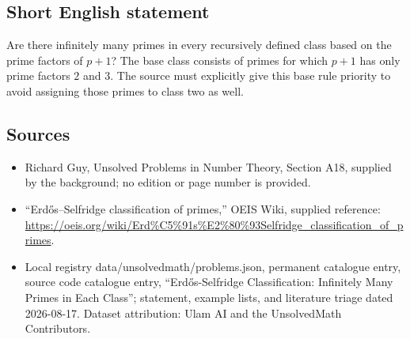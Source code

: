 \documentclass[11pt]{article}
\begin{document}
\subsection{Short English statement}
Are there infinitely many primes in every recursively defined class based on the prime factors of $p+1$? The base class consists of primes for which $p+1$ has only prime factors $2$ and $3$. The source must explicitly give this base rule priority to avoid assigning those primes to class two as well.
\subsection{Sources}
\begin{itemize}
\item Richard Guy, Unsolved Problems in Number Theory, Section A18, supplied by the background; no edition or page number is provided.
\item ``Erd\H{o}s--Selfridge classification of primes,'' OEIS Wiki, supplied reference: \url{https://oeis.org/wiki/Erd%C5%91s%E2%80%93Selfridge_classification_of_primes}.
\item Local registry data/unsolvedmath/problems.json, permanent catalogue entry, source code catalogue entry, ``Erd\H{o}s-Selfridge Classification: Infinitely Many Primes in Each Class''; statement, example lists, and literature triage dated 2026-08-17. Dataset attribution: Ulam AI and the UnsolvedMath Contributors.
\end{itemize}
\end{document}
